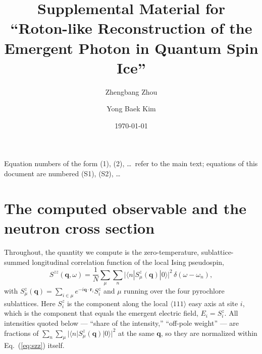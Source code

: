 \documentclass[aps,prl,twocolumn,amsmath,amssymb,superscriptaddress,
longbibliography,floatfix]{revtex4-2}
\newcommand{\bq}{\bm q}
\newcommand{\Szz}{S^{zz}}
\begin{document}
\title{Supplemental Material for\\
``Roton-like Reconstruction of the Emergent Photon in Quantum Spin Ice''}

\author{Zhengbang Zhou}
\author{Yong Baek Kim}

\date{\today}
\maketitle

Equation numbers of the form (1), (2), \dots\ refer to the main text;
equations of this document are numbered (S1), (S2), \dots

\section{The computed observable and the neutron cross section}
\label{sm:observable}


Throughout, the quantity we compute is the zero-temperature,
sublattice-summed longitudinal correlation function of the local Ising
pseudospin,
\begin{equation}
 \Szz(\bq,\omega)=\frac{1}{N}\sum_{\mu}
 \sum_{n}\big|\langle n|S^z_\mu(\bq)|0\rangle\big|^{2}\,
 \delta\!\left(\omega-\omega_{n}\right),
 \label{eq:szz}
\end{equation}
with
$S^z_\mu(\bq)=\sum_{i\in\mu}e^{-i\bq\cdot\bm r_i}S^z_i$ and $\mu$
running over the four pyrochlore sublattices. Here $S^z_i$ is the
component along the local $\langle111\rangle$ easy axis at site $i$,
which is the component that equals the emergent electric field,
$E_i=S^z_i$. All intensities quoted below --- ``share of the
intensity,'' ``off-pole weight'' --- are fractions of
$\sum_n\sum_\mu|\langle n|S^z_\mu(\bq)|0\rangle|^{2}$ at the same
$\bq$, so they are normalized within Eq.~(\ref{eq:szz}) itself.
\end{document}
